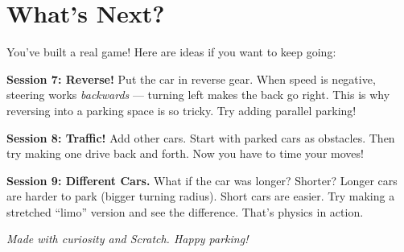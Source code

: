 \documentclass[11pt,a4paper]{article}
\begin{document}
\vfill

\section*{What's Next?}

You've built a real game! Here are ideas if you want to keep going:

\textbf{Session 7: Reverse!}
Put the car in reverse gear. When speed is negative, steering works \emph{backwards} --- turning left makes the back go right. This is why reversing into a parking space is so tricky. Try adding parallel parking!

\textbf{Session 8: Traffic!}
Add other cars. Start with parked cars as obstacles. Then try making one drive back and forth. Now you have to time your moves!

\textbf{Session 9: Different Cars.}
What if the car was longer? Shorter? Longer cars are harder to park (bigger turning radius). Short cars are easier. Try making a stretched ``limo'' version and see the difference. That's physics in action.

\vspace{1cm}
\begin{center}
\textit{Made with curiosity and Scratch. Happy parking!}
\end{center}
\end{document}
